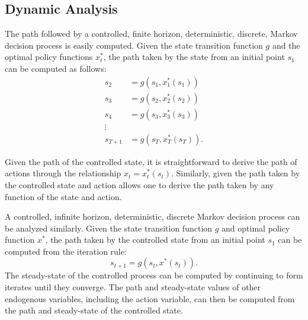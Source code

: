 \documentclass[\topdir/lecture\_notes.tex]{subfiles}
\begin{document}
\begin{optional}
\subsection{Dynamic Analysis}
The path followed by a controlled, finite horizon, deterministic, discrete, Markov decision process is easily computed. Given the state transition function $g$ and the optimal policy functions $x_{t}^{*}$, the path taken by the state from an initial point $s_{1}$ can be computed as follows:
\begin{equation*}
\begin{array}{ll}
s_{2} & =g\left(s_{1}, x_{1}^{*}\left(s_{1}\right)\right) \\
s_{3} & =g\left(s_{2}, x_{2}^{*}\left(s_{2}\right)\right) \\
s_{4} & =g\left(s_{3}, x_{3}^{*}\left(s_{3}\right)\right) \\
\vdots & \\
s_{T+1} & =g\left(s_{T}, x_{T}^{*}\left(s_{T}\right)\right) .
\end{array}
\end{equation*}

Given the path of the controlled state, it is straightforward to derive the path of actions through the relationship $x_{t}=x_{t}^{*}\left(s_{t}\right)$. Similarly, given the path taken by the controlled state and action allows one to derive the path taken by any function of the state and action.

A controlled, infinite horizon, deterministic, discrete Markov decision process can be analyzed similarly. Given the state transition function $g$ and optimal policy function $x^{*}$, the path taken by the controlled state from an initial point $s_{1}$ can be computed from the iteration rule:
\begin{equation*}
s_{t+1}=g\left(s_{t}, x^{*}\left(s_{t}\right)\right) .
\end{equation*}
The steady-state of the controlled process can be computed by continuing to form iterates until they converge. The path and steady-state values of other endogenous variables, including the action variable, can then be computed from the path and steady-state of the controlled state.


\end{optional}
\end{document}
